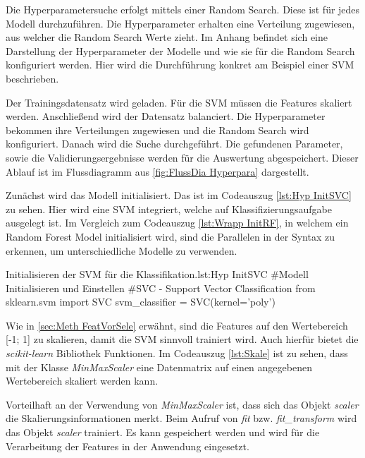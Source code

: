 Die Hyperparametersuche erfolgt mittels einer Random Search. Diese ist für jedes Modell durchzuführen. Die Hyperparameter erhalten eine Verteilung zugewiesen, aus welcher die Random Search Werte zieht. Im Anhang befindet sich eine Darstellung der Hyperparameter der Modelle und wie sie für die Random Search konfiguriert werden. Hier wird die Durchführung konkret am Beispiel einer SVM beschrieben.  \par

Der Trainingsdatensatz wird geladen. Für die SVM müssen die Features skaliert werden. Anschließend wird der Datensatz balanciert. Die Hyperparameter bekommen ihre Verteilungen zugewiesen und die Random Search wird konfiguriert. Danach wird die Suche durchgeführt. Die gefundenen Parameter, sowie die Validierungsergebnisse werden für die Auswertung abgespeichert. Dieser Ablauf ist im Flussdiagramm aus \autoref{fig:FlussDia Hyperpara} dargestellt.\par


Zunächst wird das Modell initialisiert. Das ist im Codeauszug \ref{lst:Hyp InitSVC} zu sehen. Hier wird eine SVM integriert, welche auf Klassifizierungsaufgabe ausgelegt ist. Im Vergleich zum Codeauszug \ref{lst:Wrapp InitRF}, in welchem ein Random Forest Model initialisiert wird, sind die Parallelen in der Syntax zu erkennen, um unterschiedliche Modelle zu verwenden. 

\begin{pythoncode}{Initialisieren der SVM für die Klassifikation.}{lst:Hyp InitSVC}
#Modell Initialisieren und Einstellen
#SVC - Support Vector Classification
from sklearn.svm import SVC
svm_classifier = SVC(kernel='poly')
\end{pythoncode}

Wie in \autoref{sec:Meth FeatVorSele} erwähnt, sind die Features auf den Wertebereich [-1; 1] zu skalieren, damit die SVM sinnvoll trainiert wird. Auch hierfür bietet die \textit{scikit-learn} Bibliothek Funktionen. Im Codeauszug \ref{lst:Skale} ist zu sehen, dass mit der Klasse \textit{MinMaxScaler} eine Datenmatrix auf einen angegebenen Wertebereich skaliert werden kann.\par

Vorteilhaft an der Verwendung von \textit{MinMaxScaler} ist, dass sich das Objekt \textit{scaler} die Skalierungsinformationen merkt. Beim Aufruf von \textit{fit} bzw. \textit{fit\_transform} wird das Objekt \textit{scaler} trainiert. Es kann gespeichert werden und wird für die Verarbeitung der Features in der Anwendung eingesetzt. 

